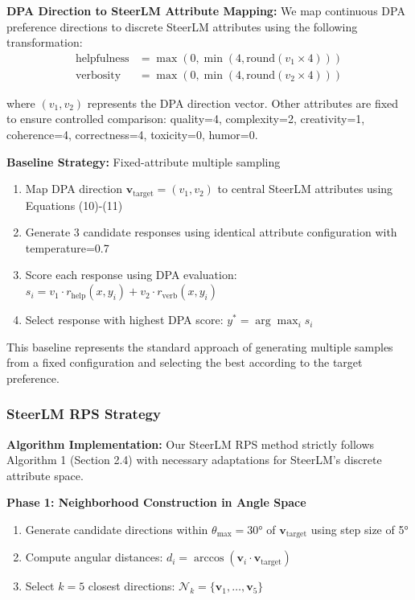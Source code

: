 \documentclass{article} %
\begin{document}
\textbf{DPA Direction to SteerLM Attribute Mapping:} We map continuous DPA preference directions to discrete SteerLM attributes using the following transformation:
\begin{align}
\text{helpfulness} &= \max(0, \min(4, \text{round}(v_1 \times 4))) \\
\text{verbosity} &= \max(0, \min(4, \text{round}(v_2 \times 4)))
\end{align}

where $(v_1, v_2)$ represents the DPA direction vector. Other attributes are fixed to ensure controlled comparison: quality=4, complexity=2, creativity=1, coherence=4, correctness=4, toxicity=0, humor=0.

\textbf{Baseline Strategy:} Fixed-attribute multiple sampling
\begin{enumerate}
    \item Map DPA direction $\mathbf{v}_{\text{target}} = (v_1, v_2)$ to central SteerLM attributes using Equations (10)-(11)
    \item Generate 3 candidate responses using identical attribute configuration with temperature=0.7
    \item Score each response using DPA evaluation: $s_i = v_1 \cdot r_{\text{help}}(x, y_i) + v_2 \cdot r_{\text{verb}}(x, y_i)$
    \item Select response with highest DPA score: $y^* = \arg\max_i s_i$
\end{enumerate}

This baseline represents the standard approach of generating multiple samples from a fixed configuration and selecting the best according to the target preference.

\subsubsection{SteerLM RPS Strategy}

\textbf{Algorithm Implementation:} Our SteerLM RPS method strictly follows Algorithm 1 (Section 2.4) with necessary adaptations for SteerLM's discrete attribute space.

\textbf{Phase 1: Neighborhood Construction in Angle Space}
\begin{enumerate}
    \item Generate candidate directions within $\theta_{\max} = 30°$ of $\mathbf{v}_{\text{target}}$ using step size of 5°
    \item Compute angular distances: $d_i = \arccos(\mathbf{v}_i \cdot \mathbf{v}_{\text{target}})$
    \item Select $k=5$ closest directions: $\mathcal{N}_k = \{\mathbf{v}_1, \ldots, \mathbf{v}_5\}$
\end{enumerate}
\end{document}
